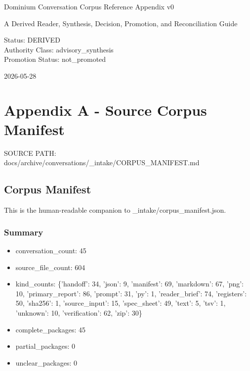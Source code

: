 \documentclass[11pt,a4paper]{report}
\begin{document}
\begin{titlepage}
\centering
{\Huge Dominium Conversation Corpus Reference Appendix v0\par}
\vspace{1cm}
{\Large A Derived Reader, Synthesis, Decision, Promotion, and Reconciliation Guide\par}
\vspace{1cm}
{\large Status: DERIVED \\ Authority Class: advisory\_synthesis \\ Promotion Status: not\_promoted\par}
\vfill
{\large 2026-05-28\par}
\end{titlepage}
\tableofcontents
\clearpage
\chapter{Appendix A - Source Corpus Manifest}


{\small\raggedright SOURCE PATH: docs/\allowbreak{}archive/\allowbreak{}conversations/\allowbreak{}\_\allowbreak{}intake/\allowbreak{}CORPUS\_\allowbreak{}MANIFEST.md\par}


\section{Corpus Manifest}

This is the human-readable companion to \_intake/corpus\_manifest.json.


\subsection{Summary}

\begin{itemize}
\item conversation\_count: 45
\item source\_file\_count: 604
\item kind\_counts: \{'handoff': 34, 'json': 9, 'manifest': 69, 'markdown': 67, 'png': 10, 'primary\_report': 86, 'prompt': 31, 'py': 1, 'reader\_brief': 74, 'registers': 50, 'sha256': 1, 'source\_input': 15, 'spec\_sheet': 49, 'text': 5, 'tsv': 1, 'unknown': 10, 'verification': 62, 'zip': 30\}
\item complete\_packages: 45
\item partial\_packages: 0
\item unclear\_packages: 0
\end{itemize}
\end{document}
